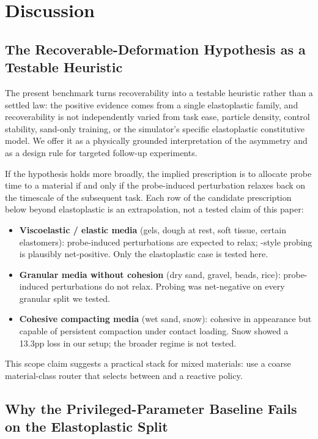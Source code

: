 \section{Discussion}
\label{sec:discussion}

\subsection{The Recoverable-Deformation Hypothesis as a Testable Heuristic}

The present benchmark turns recoverability into a testable heuristic rather than a settled law: the positive evidence comes from a single elastoplastic family, and recoverability is not independently varied from task ease, particle density, control stability, sand-only training, or the simulator's specific elastoplastic constitutive model. We offer it as a physically grounded interpretation of the asymmetry and as a design rule for targeted follow-up experiments.

If the hypothesis holds more broadly, the implied prescription is to allocate probe time to a material if and only if the probe-induced perturbation relaxes back on the timescale of the subsequent task. Each row of the candidate prescription below beyond elastoplastic is an extrapolation, not a tested claim of this paper:
\begin{itemize}
    \item \textbf{Viscoelastic / elastic media} (gels, dough at rest, soft tissue, certain elastomers): probe-induced perturbations are expected to relax; \PTA{}-style probing is plausibly net-positive. Only the elastoplastic case is tested here.
    \item \textbf{Granular media without cohesion} (dry sand, gravel, beads, rice): probe-induced perturbations do not relax. Probing was net-negative on every granular split we tested.
    \item \textbf{Cohesive compacting media} (wet sand, snow): cohesive in appearance but capable of persistent compaction under contact loading. Snow showed a 13.3pp loss in our setup; the broader regime is not tested.
\end{itemize}

This scope claim suggests a practical stack for mixed materials: use a coarse material-class router that selects between \PTA{} and a reactive policy.

\subsection{Why the Privileged-Parameter Baseline Fails on the Elastoplastic Split}

